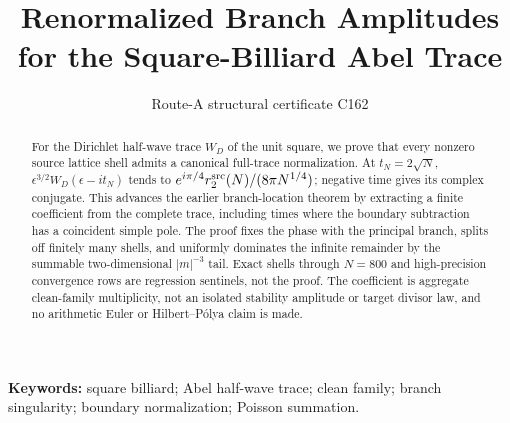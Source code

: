 \documentclass[10pt]{article}
\title{\vspace{-1.5em}Renormalized Branch Amplitudes for the Square-Billiard Abel Trace}
\author{Route-A structural certificate C162}
\date{}
\begin{document}
\maketitle
\begin{abstract}
For the Dirichlet half-wave trace $W_D$ of the unit square, we prove that every
nonzero source lattice shell admits a canonical full-trace normalization.  At
$t_N=2\sqrt N$,
$\epsilon^{3/2}W_D(\epsilon-it_N)$ tends to
$e^{i\pi/4}r_2^{\rm src}(N)/(8\pi N^{1/4})$; negative time gives its complex
conjugate.  This advances the earlier branch-location theorem by extracting a
finite coefficient from the complete trace, including times where the
boundary subtraction has a coincident simple pole.  The proof fixes the phase
with the principal branch, splits off finitely many shells, and uniformly
dominates the infinite remainder by the summable two-dimensional
$|m|^{-3}$ tail.  Exact shells through $N=800$ and high-precision convergence
rows are regression sentinels, not the proof.  The coefficient is aggregate
clean-family multiplicity, not an isolated stability amplitude or target
divisor law, and no arithmetic Euler or Hilbert--P\'olya claim is made.
\end{abstract}
\noindent\textbf{Keywords:} square billiard; Abel half-wave trace; clean
family; branch singularity; boundary normalization; Poisson summation.
\end{document}
